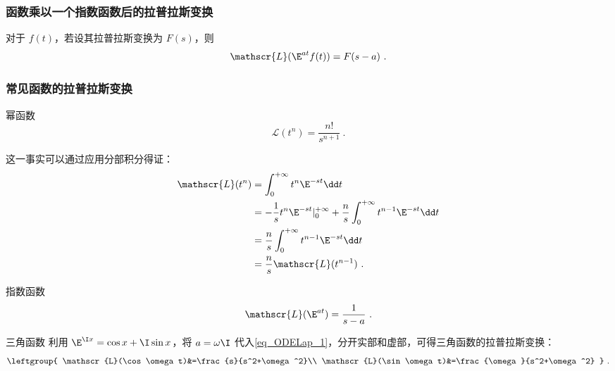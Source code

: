 \subsubsection{函数乘以一个指数函数后的拉普拉斯变换}




\begin{theorem}{}\label{the_ODELap_2}
对于 $f(t)$，若设其拉普拉斯变换为 $F(s)$，则
\begin{equation}
\mathscr{L}(\E^{at}f(t))=F(s-a)~.
\end{equation}
\end{theorem}









\subsubsection{常见函数的拉普拉斯变换}

\begin{example}{幂函数}
\begin{equation}\label{eq_ODELap_11}
\mathscr{L}(t^n)=\frac{n!}{s^{n+1}}~.
\end{equation}

这一事实可以通过应用分部积分得证：
\begin{equation}\label{eq_ODELap_2}
\begin{aligned}
\mathscr{L}(t^n)&=\int_0^{+\infty}t^n\E^{-st}\dd t\\
&=-\frac{1}{s}t^n\E^{-st}|^{+\infty}_0+\frac{n}{s}\int_0^{+\infty}t^{n-1}\E^{-st}\dd t\\
&=\frac{n}{s}\int_0^{+\infty}t^{n-1}\E^{-st}\dd t\\
&=\frac{n}{s}\mathscr{L}(t^{n-1})~.
\end{aligned}
\end{equation}
\end{example}

\begin{example}{指数函数}
\begin{equation}\label{eq_ODELap_1}
\mathscr{L}(\E^{at})=\frac{1}{s-a}~.
\end{equation}

\end{example}

\begin{example}{三角函数}
利用 $\E^{\I x}=\cos x+\I\sin x$，将 $a=\omega\I$ 代入\autoref{eq_ODELap_1}，分开实部和虚部，可得三角函数的拉普拉斯变换：
\begin{equation}\label{eq_ODELap_3}
\leftgroup{
    \mathscr{L}(\cos \omega t)&=\frac{s}{s^2+\omega^2}\\
    \mathscr{L}(\sin \omega t)&=\frac{\omega}{s^2+\omega^2}
}~.
\end{equation}
\end{example}


